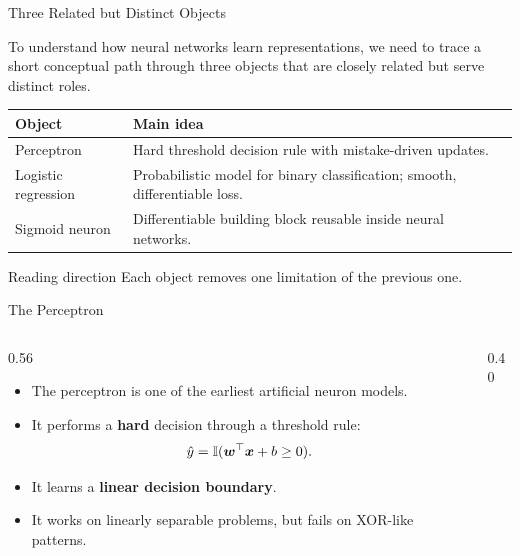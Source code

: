 \documentclass[11pt,aspectratio=169,professionalfonts]{beamer}
\begin{document}
\begin{frame}{Three Related but Distinct Objects}

To understand how neural networks learn representations, we need to trace a short conceptual path through three objects that are closely related but serve distinct roles.

\vspace{0.25cm}

\centering
\small
\begin{tabular}{l l}
\toprule
\textbf{Object} & \textbf{Main idea} \\
\midrule
Perceptron          & Hard threshold decision rule with mistake-driven updates. \\[4pt]
Logistic regression & Probabilistic model for binary classification; smooth, differentiable loss. \\[4pt]
Sigmoid neuron      & Differentiable building block reusable inside neural networks. \\
\bottomrule
\end{tabular}

\raggedright
\vspace{0.2cm}
\begin{block}{Reading direction}
Each object removes one limitation of the previous one.
\end{block}
\end{frame}
%
%
\begin{frame}{The Perceptron}
\begin{columns}[T]
\begin{column}{0.56\textwidth}
\begin{itemize}
    \item The perceptron is one of the earliest artificial neuron models.
    \item It performs a \textbf{hard} decision through a threshold rule:
    \[
    \hat{y} = \mathbb{I}(\bm{w}^{\top}\bm{x} + b \ge 0).
    \]
    \item It learns a \textbf{linear decision boundary}.
    \item It works on linearly separable problems, but fails on XOR-like patterns.
\end{itemize}
\end{column}
\begin{column}{0.40\textwidth}
\end{column}
\end{columns}
\end{frame}
\end{document}
